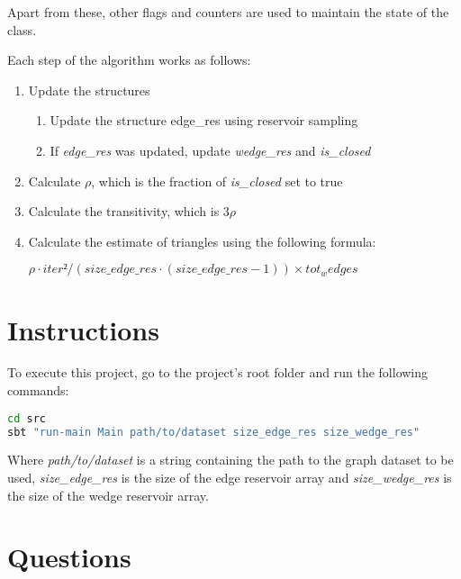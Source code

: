 \documentclass[12pt, a4paper]{article}
\begin{document}
Apart from these, other flags and counters are used to maintain the state of the class.

Each step of the algorithm works as follows:
\begin{enumerate}
\item Update the structures
\begin{enumerate}
	\item Update the structure edge\_res using reservoir sampling
	\item If \emph{edge\_res} was updated, update \emph{wedge\_res} and \emph{is\_closed}
\end{enumerate}
\item Calculate $\rho$, which is the fraction of \emph{is\_closed} set to true
\item Calculate the transitivity, which is $3\rho$
\item Calculate the estimate of triangles using the following formula:
\begin{center}
$\rho \cdot iter²/(size\_edge\_res \cdot (size\_edge\_res - 1)) \times tot_wedges$
\end{center}
\end{enumerate}

\section{Instructions}
To execute this project, go to the project's root folder and run the following commands:

\begin{lstlisting}[language=bash]
cd src
sbt "run-main Main path/to/dataset size_edge_res size_wedge_res"
\end{lstlisting}

Where \emph{path/to/dataset} is a string containing the path to the graph dataset to be used, \emph{size\_edge\_res} is the size of the edge reservoir array and \emph{size\_wedge\_res} is the size of the wedge reservoir array.

\section{Questions}
\end{document}
